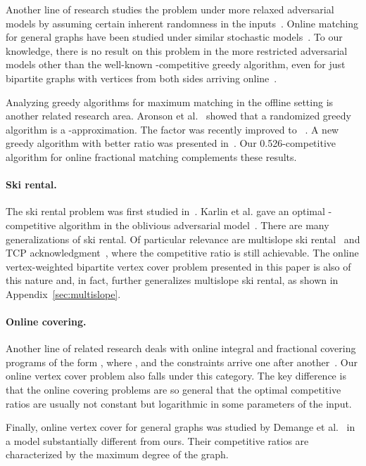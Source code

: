 \documentclass{article}
\begin{document}
Another line of research studies the problem under more relaxed adversarial models by assuming certain inherent randomness in the inputs~\cite{Feldman2009,Manshadi2011,Mahdian2011, Karande2011}. Online matching for general graphs have been studied under similar stochastic models~\cite{bansal2010lp}. To our knowledge, there is no result on this problem in the more restricted adversarial models other than the well-known -competitive greedy algorithm, even for just bipartite graphs with vertices from both sides arriving online~\cite{Blum2006}.

Analyzing greedy algorithms for maximum matching in the offline setting is another related research area. Aronson et al.~\cite{Aronson1995} showed that a randomized greedy algorithm is a -approximation. The factor was recently improved to ~\cite{poloczek12}. A new greedy algorithm with better ratio was presented in~\cite{goel12}. Our 0.526-competitive algorithm for online fractional matching complements these results. 

\paragraph{Ski rental.} The ski rental problem was first studied in~\cite{karlin1988competitive}. Karlin et al. gave an optimal -competitive algorithm in the oblivious adversarial model~\cite{Karlin1994}. There are many generalizations of ski rental. Of particular relevance are multislope ski rental~\cite{Lotker2008}  and TCP acknowledgment~\cite{Karlin2001}, where the competitive ratio  is still achievable. 
The online vertex-weighted bipartite vertex cover problem presented in this paper is also of this nature and, in fact, further generalizes multislope ski rental, as shown in Appendix~\ref{sec:multislope}.

\paragraph{Online covering.} Another line of related research deals with online integral and fractional covering programs of the form , where , and the constraints  arrive one after another~\cite{Buchbinder2009}. Our online vertex cover problem also falls under this category. The key difference is that the online covering problems are so general that the optimal competitive ratios are usually not constant but logarithmic in some parameters of the input.

Finally, online vertex cover for general graphs was studied by Demange et al.~\cite{Demange2005} in a model substantially different from ours. Their competitive ratios are characterized by the maximum degree of the graph.
\end{document}
